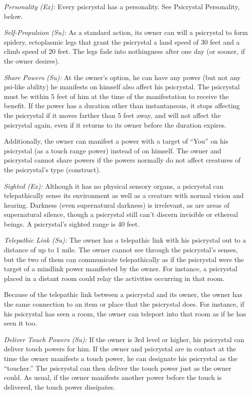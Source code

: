 \textit{Personality (Ex):} Every psicrystal has a personality. See Psicrystal Personality, below.

\textit{Self-Propulsion (Su):} As a standard action, its owner can will a psicrystal to form spidery, ectoplasmic legs that grant the psicrystal a land speed of 30 feet and a climb speed of 20 feet. The legs fade into nothingness after one day (or sooner, if the owner desires).

\textit{Share Powers (Su):} At the owner's option, he can have any power (but not any psi-like ability) he manifests on himself also affect his psicrystal. The psicrystal must be within 5 feet of him at the time of the manifestation to receive the benefit. If the power has a duration other than instantaneous, it stops affecting the psicrystal if it moves farther than 5 feet away, and will not affect the psicrystal again, even if it returns to its owner before the duration expires.

Additionally, the owner can manifest a power with a target of ``You'' on his psicrystal (as a touch range power) instead of on himself. The owner and psicrystal cannot share powers if the powers normally do not affect creatures of the psicrystal's type (construct).

\textit{Sighted (Ex):} Although it has no physical sensory organs, a psicrystal can telepathically sense its environment as well as a creature with normal vision and hearing. Darkness (even supernatural darkness) is irrelevant, as are areas of supernatural silence, though a psicrystal still can't discern invisible or ethereal beings. A psicrystal's sighted range is 40 feet.

\textit{Telepathic Link (Su):} The owner has a telepathic link with his psicrystal out to a distance of up to 1 mile. The owner cannot see through the psicrystal's senses, but the two of them can communicate telepathically as if the psicrystal were the target of a mindlink power manifested by the owner. For instance, a psicrystal placed in a distant room could relay the activities occurring in that room.

Because of the telepathic link between a psicrystal and its owner, the owner has the same connection to an item or place that the psicrystal does. For instance, if his psicrystal has seen a room, the owner can teleport into that room as if he has seen it too.

\textit{Deliver Touch Powers (Su):} If the owner is 3rd level or higher, his psicrystal can deliver touch powers for him. If the owner and psicrystal are in contact at the time the owner manifests a touch power, he can designate his psicrystal as the ``toucher.'' The psicrystal can then deliver the touch power just as the owner could. As usual, if the owner manifests another power before the touch is delivered, the touch power dissipates.

